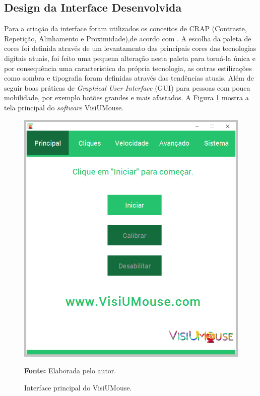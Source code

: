 \subsection{Design da Interface Desenvolvida}\label{Sub:software}
Para a criação da interface foram utilizados os conceitos de CRAP (Contraste, Repetição, Alinhamento e Proximidade),de acordo com . A escolha da paleta de cores foi definida através de um levantamento das principais cores das tecnologias digitais atuais, foi feito uma pequena alteração nesta paleta para torná-la única e por consequência uma característica da própria tecnologia, as outras estilizações como sombra e tipografia foram definidas através das tendências atuais. Além de seguir boas práticas de \textit{Graphical User Interface} (GUI) para pessoas com pouca mobilidade, por exemplo botões grandes e mais afastados. A Figura \ref{fig:interface-tecnologia} mostra a tela principal do \textit{software} VisiUMouse.

\begin{figure}[htbp]
\caption{Interface principal do VisiUMouse.} 
\centering \includegraphics[scale=.5]{img/visiumouse-tela-principal-v216.png}

{\fontsize{11}{11}\selectfont \textbf{Fonte:} Elaborada pelo autor.}
\label{fig:interface-tecnologia}
\end{figure}

